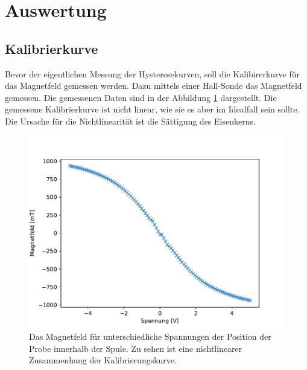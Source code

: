 \section{Auswertung}
\subsection{Kalibrierkurve}
Bevor der eigentlichen Messung der Hysteresekurven, soll die Kalibirerkurve für das Magnetfeld gemessen werden. Dazu mittels einer Hall-Sonde das Magnetfeld gemessen. Die gemessenen Daten sind in der Abbildung \ref{fig:Kalibrierung} dargestellt. Die gemessene Kalibrierkurve ist nicht linear, wie sie es aber im Idealfall sein sollte. Die Ursache für die Nichtlinearität ist die Sättigung des Eisenkerns. 
\begin{figure}[H]
\centering
\includegraphics[scale=0.8]{../Messdaten/auswertung/Kalibrierung.pdf}
\caption{ Das Magnetfeld für unterschiedliche Spannungen der Position der Probe innerhalb der Spule. Zu sehen ist eine nichtlinearer Zusammenhang der Kalibrierungskurve. }
\label{fig:Kalibrierung}
\end{figure}



